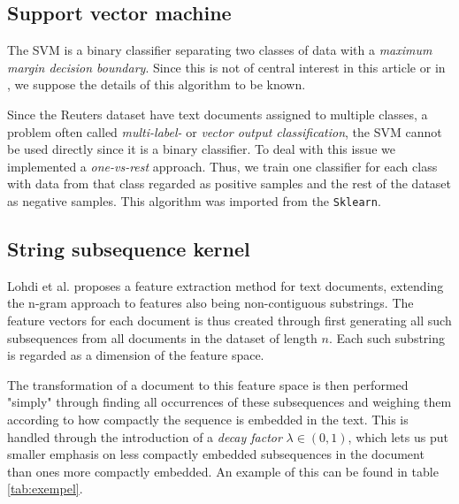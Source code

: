 
\subsection{Support vector machine}
The SVM is a binary classifier separating two classes of data with a \textit{maximum margin decision boundary}. Since this is not of central interest in this article or in \cite{lodhi}, we suppose the details of this algorithm to be known. %

Since the Reuters dataset have text documents assigned to multiple classes, a problem often called\textit{ multi-label-} or \textit{vector output classification}, the SVM cannot be used directly since it is a binary classifier. To deal with this issue we implemented a \textit{one-vs-rest} approach. Thus, we train one classifier for each class with data from that class regarded as positive samples and the rest of the dataset as negative samples. This algorithm was imported from the \texttt{Sklearn}. 

\subsection{String subsequence kernel}
Lohdi et al. proposes a feature extraction method for text documents, extending the n-gram approach to features also being non-contiguous substrings. The feature vectors for each document is thus created through first generating all such subsequences from all documents in the dataset of length $ n $. Each such substring is regarded as a dimension of the feature space. 

The transformation of a document to this feature space is then performed "simply" through finding all occurrences of these subsequences and weighing them according to how compactly the sequence is embedded in the text. This is handled through the introduction of a \textit{decay factor} $ \lambda \in (0,1) $, which lets us put smaller emphasis on less compactly embedded subsequences in the document than ones more compactly embedded. An example of this can be found in table \ref{tab:exempel}. %


